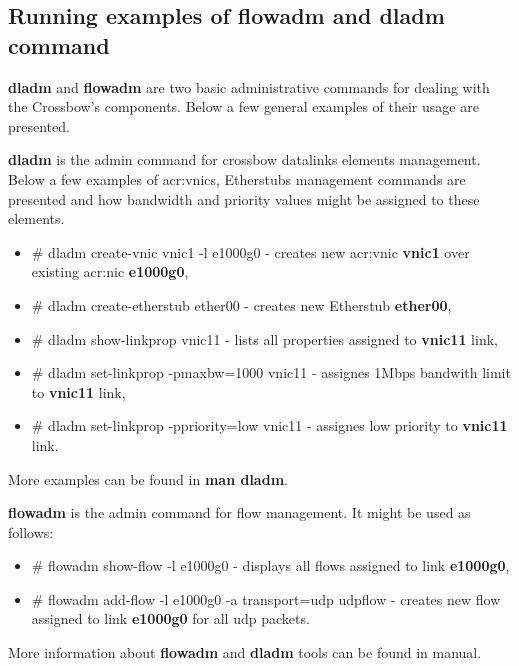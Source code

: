 \documentclass[11pt]{book}
\begin{document}
      \subsection{Running examples of flowadm and dladm command}

        \textbf{dladm} and \textbf{flowadm} are two basic administrative commands for dealing with the Crossbow's
        components. Below a few general examples of their usage are presented.
  
        \textbf{dladm} is the admin command for crossbow datalinks elements management. Below a few examples of \gls{acr:vnic}s,
        Etherstubs management commands are presented and how bandwidth and priority values might be assigned to these
        elements.
  
        \begin{itemize}
          \item \# dladm create-vnic vnic1 -l e1000g0 - creates new \gls{acr:vnic} \textbf{vnic1} over existing \gls{acr:nic} \textbf{e1000g0},
          \item \# dladm create-etherstub ether00 - creates new Etherstub \textbf{ether00},
          \item \# dladm show-linkprop vnic11 - lists all properties assigned to \textbf{vnic11} link,
          \item \# dladm set-linkprop -pmaxbw=1000 vnic11 - assignes 1Mbps bandwith limit to \textbf{vnic11} link,
          \item \# dladm set-linkprop -ppriority=low vnic11 - assignes low priority to \textbf{vnic11} link.
        \end{itemize}
  
        More examples can be found in \textbf{man dladm}.

        \medskip

        \textbf{flowadm} is the admin command for flow management. It might be used as follows:     

        \begin{itemize}
          \item \# flowadm show-flow -l e1000g0 - displays all flows assigned to link \textbf{e1000g0},
          \item \# flowadm add-flow -l e1000g0 -a transport=udp udpflow - creates new flow assigned to link
                \textbf{e1000g0} for all udp packets.
        \end{itemize}

        More information about \textbf{flowadm} and \textbf{dladm} tools can be found in manual.
\end{document}
